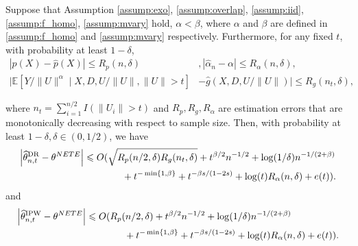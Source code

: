 \documentclass[10pt,a4paper]{amsart}
\begin{document}
\begin{theorem}
  \label{thm:rate}Suppose that Assumption
  \ref{assump:exo}, \ref{assump:overlap}, \ref{assump:iid}, \ref{assump:f_homo}, \ref{assump:mvary} hold, $\alpha < \beta$, where $\alpha$
  and $\beta$ are defined in \cref{assump:f_homo} and \cref{assump:mvary}
  respectively. Furthermore, for any fixed $t$, with probability at least $1 -
  \delta$,
  \begin{align*}
    |p (X) - \hat{p} (X) | \leqslant R_p (n, \delta) & ,  | \hat{\alpha}_{n} - \alpha| \leqslant R_\alpha(n,\delta),\\
    |\mathbb{E}[Y/\|U\|^{\alpha} \mid X, D, U /\|U\|, \|U\|> t] &- \hat{g} (X, D, U /\|U\|)
    | \leqslant R_g (n_t, \delta),
  \end{align*}
  
  where $n_t = \sum_{i = 1}^{n/2} I (\|U_i \|> t)$ and $R_p, R_g, R_\alpha$ are estimation
  errors that are monotonically decreasing with respect to sample size. Then, with probability at
  least $1 - \delta, \delta \in (0, 1 / 2)$, we have
  \begin{align}
    \left| {{\widehat{\theta }_{n, t}^{\text{DR} }} }   -
    \theta^{NETE} \right|  & \leqslant O (\sqrt{R_p (n/2, \delta)R_g ({n_t}, \delta)} + t^{\beta / 2} n^{-1 / 2}+ \log (1 / \delta) n^{- 1 / (2 +\beta)}  \notag\\
    & \quad\quad \quad \quad + t^{- \min \{1, \beta\}}  + t^{- \beta s / (1 - 2 s)} + \log(t)R_\alpha(n,\delta)+ e (t)).\label{eq:rate_dr} 
  \end{align}
  and
  \begin{align}
    \left| {{\widehat{\theta }_{n, t}^{\text{IPW}}} }   - \theta^{NETE}
    \right| & \leqslant O (R_p (n/2, \delta)  +t^{\beta / 2} n^{- 1 / 2} + \log (1 / \delta)
    n^{- 1 / (2 + \beta)} \notag\\
    &\quad\quad \quad \quad  + t^{- \min \{1, \beta\}} + t^{- \beta s / (1 - 2 s)}+ \log(t)R_\alpha(n,\delta) + e (t)). \label{eq:rate_ipw}
  \end{align}
\end{theorem} 
\end{document}
